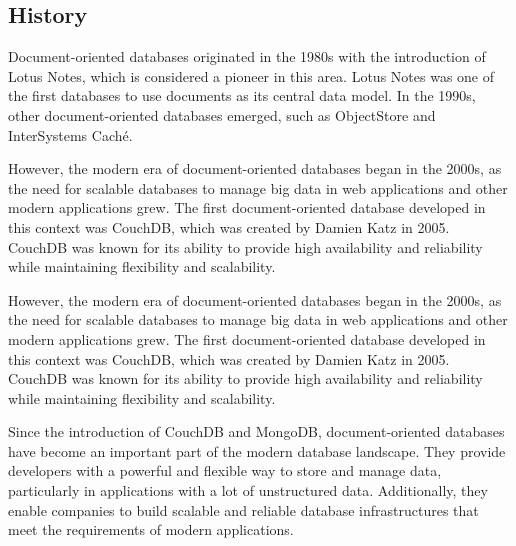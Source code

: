 \subsection{History}

Document-oriented databases originated in the 1980s with the introduction of Lotus Notes, 
which is considered a pioneer in this area. Lotus Notes was one of the first databases to use 
documents as its central data model. In the 1990s, other document-oriented databases emerged, 
such as ObjectStore and InterSystems Caché.

However, the modern era of document-oriented databases began in the 2000s, as the need for 
scalable databases to manage big data in web applications and other modern applications grew. 
The first document-oriented database developed in this context was CouchDB, which was created by 
Damien Katz in 2005. CouchDB was known for its ability to provide high availability and 
reliability while maintaining flexibility and scalability.

However, the modern era of document-oriented databases began in the 2000s, as the need for 
scalable databases to manage big data in web applications and other modern applications grew. 
The first document-oriented database developed in this context was CouchDB, which was created by 
Damien Katz in 2005. CouchDB was known for its ability to provide high availability and 
reliability while maintaining flexibility and scalability.

Since the introduction of CouchDB and MongoDB, document-oriented databases have become an 
important part of the modern database landscape. They provide developers with a powerful and 
flexible way to store and manage data, particularly in applications with a lot of unstructured 
data. Additionally, they enable companies to build scalable and reliable database infrastructures 
that meet the requirements of modern applications.

